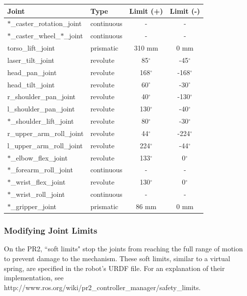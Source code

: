 \begin{tabular}{ll*{2}{c}}
Joint  & Type  & Limit (+) & Limit (-) \\
\hline \hline
$\ast$\_caster\_rotation\_joint        & continuous & -            & - \\
$\ast$\_caster\_wheel\_$\ast$\_joint   & continuous & -            & - \\
torso\_lift\_joint                     & prismatic  & 310 mm       & 0 mm \\
laser\_tilt\_joint                     & revolute   & 85$^\circ$   & -45$^\circ$ \\
head\_pan\_joint                       & revolute   & 168$^\circ$  & -168$^\circ$  \\
head\_tilt\_joint                      & revolute   & 60$^\circ$   & -30$^\circ$  \\
r\_shoulder\_pan\_joint                 & revolute   & 40$^\circ$   & -130$^\circ$  \\
l\_shoulder\_pan\_joint                 & revolute   & 130$^\circ$  & -40$^\circ$  \\
$\ast$\_shoulder\_lift\_joint          & revolute   & 80$^\circ$   & -30$^\circ$  \\
r\_upper\_arm\_roll\_joint              & revolute   & 44$^\circ$   & -224$^\circ$  \\
l\_upper\_arm\_roll\_joint              & revolute   & 224$^\circ$  & -44$^\circ$  \\
$\ast$\_elbow\_flex\_joint             & revolute   & 133$^\circ$  & 0$^\circ$  \\
$\ast$\_forearm\_roll\_joint           & continuous & -            & - \\
$\ast$\_wrist\_flex\_joint             & revolute   & 130$^\circ$  & 0$^\circ$  \\
$\ast$\_wrist\_roll\_joint             & continuous & -            & - \\
$\ast$\_gripper\_joint                 & prismatic  & 86 mm        & 0 mm \\
\end{tabular}

\subsubsection{Modifying Joint Limits}

On the PR2, ``soft limits" stop the joints from reaching the full range of
motion to prevent damage to the mechanism. These soft limits, similar to a
virtual spring, are specified in the robot's URDF file. For an explanation of
their implementation, see
http://www.ros.org/wiki/pr2\_controller\_manager/safety\_limits.

